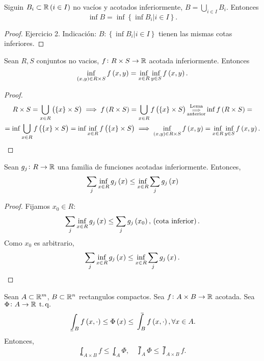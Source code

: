 \begin{lema*}
    Siguin $B_i \subset \mathbb{R} \left( i\in I\right)$ no vacíos y acotados inferiormente, $B = \bigcup\limits_{i\in I} B_i$. Entonces
    \[ \inf B = \inf\left\{\inf B_i | i\in I\right\}.\]
\end{lema*}
\begin{proof}
    Ejercicio 2. Indicación: $B \colon \left\{ \inf B_i | i\in I\right\}$ tienen las mismas cotas inferiores.
\end{proof}
\begin{lema}\label{lema:2_6_1}
    Sean $R, S$ conjuntos no vacios, $f \colon R\times S \to \mathbb{R}$ acotada inferiormente. Entonces
    \[ \inf_{\left( x,y\right)\in R\times S} f\left( x,y\right) = \inf_{x\in R}\inf_{y\in S} f\left( x,y\right). \]
\end{lema}
\begin{proof}
    \begin{gather*}
        R\times S = \bigcup_{x\in R} \left( \left\{x\right\}\times S\right) \implies f\left( R\times S\right) = \bigcup_{x\in R} f\left(\left\{ x\right\} \times S\right) \substack{\text{Lema}\\ \implies\\ \text{anterior}} \inf f\left( R\times S \right) = \\ = \inf \bigcup_{x\in R} f\left( \left\{x\right\} \times S\right) = \inf \inf_{x\in R} f\left( \left\{x\right\} \times S\right) \implies \inf_{\left( x,y\right) \in R\times S} f\left( x,y\right) = \inf_{x\in R} \inf_{y\in S} f\left( x,y\right).
    \end{gather*}
\end{proof}
\begin{lema}\label{lema:2_6_2}
    Sean $g_j \colon R \to \mathbb{R}$ una familia de funciones acotadas inferiormente. Entonces,
    \[ \sum_j \inf_{x\in R} g_j\left( x\right) \leq \inf_{x\in R} \sum_j g_j\left( x\right) \]
\end{lema}
\begin{proof}
    Fijamos $x_0 \in R:$
    \[ \sum_j \inf_{x\in R} g_j\left( x\right) \leq \sum_j g_j \left( x_0\right), \,\left(\text{cota inferior}\right). \]
    Como $x_0$ es arbitrario,
    \[ \sum_j \inf_{x\in R} g_j\left( x\right) \leq \inf_{x\in R} \sum_j g_j\left( x\right). \]
\end{proof}
\begin{lema}\label{lema:fubin_exp}
    Sean $A \subset \mathbb{R}^m$, $B \subset \mathbb{R}^n$ rectangulos compactos. Sea $f \colon A\times B\to\mathbb{R}$ acotada. Sea $\Phi \colon A\to\mathbb{R} \operatorname{\;t.q.\;}$
    \[ \lowint_B f\lp x,\cdot\rp\leq\Phi\lp x\rp\leq\upint_B f\lp x,\cdot\rp, \forall x\in A. \]
    Entonces,
    \[
        \lowint_{A\times B} f \leq \lowint_A \Phi, \quad
        \upint_A \Phi \leq \upint_{A\times B} f.
    \]
\end{lema}
